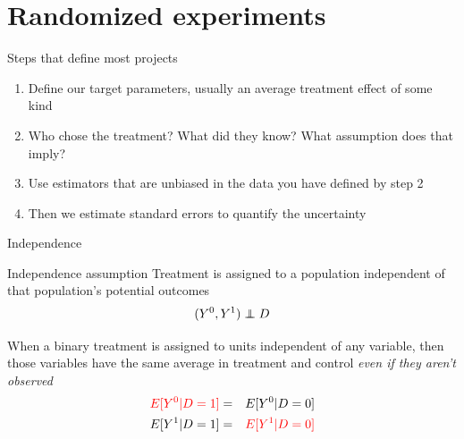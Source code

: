\documentclass{beamer}
\newcommand\independent{\protect\mathpalette{\protect\independenT}{\perp}}
\def\independenT#1#2{\mathrel{\rlap{$#1#2$}\mkern2mu{#1#2}}}
\begin{document}
\section{Randomized experiments}





\begin{frame}{Steps that define most projects}


\begin{enumerate}
\item Define our target parameters, usually an average treatment effect of some kind
\item Who chose the treatment?  What did they know?  What assumption does that imply?
\item Use estimators that are unbiased in the data you have defined by step 2
\item Then we estimate standard errors to quantify the uncertainty
\end{enumerate}

\end{frame}

\begin{frame}{Independence}


  \begin{block}{Independence assumption}
    Treatment is assigned to a population independent of that population's potential outcomes  $$(Y^0,Y^1)\independent{D}$$
  \end{block}
  When a binary treatment is assigned to units independent of any variable, then those variables have the same average in treatment and control \emph{even if they aren't observed}
  \begin{eqnarray*}
    \textcolor{red}{E[Y^0|D=1]} &=& E[Y^0 | D=0] \\
    E[Y^1|D=1] &=& \textcolor{red}{E[Y^1 | D=0]}
  \end{eqnarray*}
\end{frame}
\end{document}
